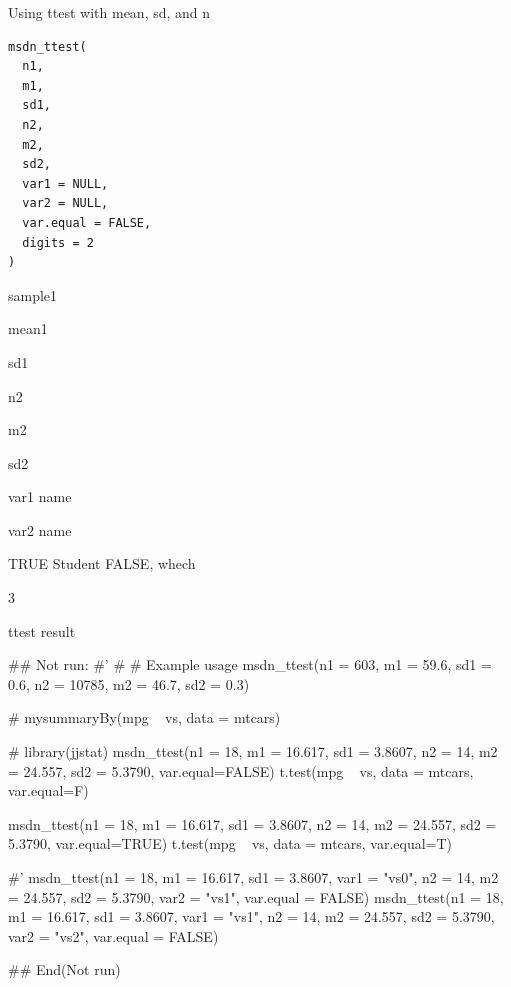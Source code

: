 \documentclass[a4paper]{book}
\begin{document}
%
\begin{Description}
Using ttest with mean, sd, and n
\end{Description}
%
\begin{Usage}
\begin{verbatim}
msdn_ttest(
  n1,
  m1,
  sd1,
  n2,
  m2,
  sd2,
  var1 = NULL,
  var2 = NULL,
  var.equal = FALSE,
  digits = 2
)
\end{verbatim}
\end{Usage}
%
\begin{Arguments}
\begin{ldescription}
\item[\code{n1}] sample1

\item[\code{m1}] mean1

\item[\code{sd1}] sd1

\item[\code{n2}] n2

\item[\code{m2}] m2

\item[\code{sd2}] sd2

\item[\code{var1}] var1 name

\item[\code{var2}] var2 name

\item[\code{var.equal}] TRUE Student FALSE, whech

\item[\code{digits}] 3
\end{ldescription}
\end{Arguments}
%
\begin{Value}
ttest result
\end{Value}
%
\begin{Examples}
\begin{ExampleCode}

\#\# Not run: 
#'
# # Example usage
msdn_ttest(n1 = 603, m1 = 59.6, sd1 = 0.6,
           n2 = 10785, m2 = 46.7, sd2 = 0.3)

#  mysummaryBy(mpg ~ vs, data = mtcars)

# library(jjstat)
msdn_ttest(n1 = 18, m1 = 16.617, sd1 = 3.8607,
           n2 = 14, m2 = 24.557, sd2 = 5.3790,  var.equal=FALSE)
t.test(mpg ~ vs, data = mtcars, var.equal=F)%

msdn_ttest(n1 = 18, m1 = 16.617, sd1 = 3.8607,
           n2 = 14, m2 = 24.557, sd2 = 5.3790, var.equal=TRUE)
t.test(mpg ~ vs, data = mtcars, var.equal=T)%

#'
msdn_ttest(n1 = 18, m1 = 16.617, sd1 = 3.8607, var1 = "vs0",
           n2 = 14, m2 = 24.557, sd2 = 5.3790, var2 = "vs1", var.equal = FALSE)
msdn_ttest(n1 = 18, m1 = 16.617, sd1 = 3.8607, var1 = "vs1",
           n2 = 14, m2 = 24.557, sd2 = 5.3790, var2 = "vs2", var.equal = FALSE)



## End(Not run)

\end{ExampleCode}
\end{Examples}
\end{document}
